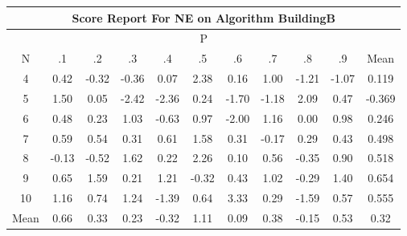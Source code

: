 \documentclass[11pt,a4paper]{report}
\begin{document}
\begin{longtable}{ | c || c | c | c | c | c | c | c | c | c || c |}
\hline
\multicolumn{11}{|c|}{ Score Report For NE on Algorithm BuildingB} \\
\hline
\multicolumn{11}{|c|}{ P } \\
\hline
N & .1 & .2 & .3 & .4 & .5 & .6 & .7 & .8 & .9 & Mean\\
 \hline
 \hline
 \endhead
  4 &  \cellcolor[HTML]{F7F7FF} 0.42 &  \cellcolor[HTML]{FFF7F7} -0.32 &  \cellcolor[HTML]{FFF7F7} -0.36 &  \cellcolor[HTML]{FFFFFF} 0.07 &  \cellcolor[HTML]{BFBFFF} 2.38 &  \cellcolor[HTML]{F7F7FF} 0.16 &  \cellcolor[HTML]{E7E7FF} 1.00 &  \cellcolor[HTML]{FFDFDF} -1.21 &  \cellcolor[HTML]{FFE7E7} -1.07 & 0.119 \\
  5 &  \cellcolor[HTML]{D7D7FF} 1.50 &  \cellcolor[HTML]{FFFFFF} 0.05 &  \cellcolor[HTML]{FFBFBF} -2.42 &  \cellcolor[HTML]{FFC7C7} -2.36 &  \cellcolor[HTML]{F7F7FF} 0.24 &  \cellcolor[HTML]{FFD7D7} -1.70 &  \cellcolor[HTML]{FFDFDF} -1.18 &  \cellcolor[HTML]{C7C7FF} 2.09 &  \cellcolor[HTML]{F7F7FF} 0.47 & -0.369 \\
  6 &  \cellcolor[HTML]{EFEFFF} 0.48 &  \cellcolor[HTML]{F7F7FF} 0.23 &  \cellcolor[HTML]{E7E7FF} 1.03 &  \cellcolor[HTML]{FFEFEF} -0.63 &  \cellcolor[HTML]{E7E7FF} 0.97 &  \cellcolor[HTML]{FFCFCF} -2.00 &  \cellcolor[HTML]{DFDFFF} 1.16 &  \cellcolor[HTML]{FFFFFF} 0.00 &  \cellcolor[HTML]{E7E7FF} 0.98 & 0.246 \\
  7 &  \cellcolor[HTML]{EFEFFF} 0.59 &  \cellcolor[HTML]{EFEFFF} 0.54 &  \cellcolor[HTML]{F7F7FF} 0.31 &  \cellcolor[HTML]{EFEFFF} 0.61 &  \cellcolor[HTML]{D7D7FF} 1.58 &  \cellcolor[HTML]{F7F7FF} 0.31 &  \cellcolor[HTML]{FFF7F7} -0.17 &  \cellcolor[HTML]{F7F7FF} 0.29 &  \cellcolor[HTML]{F7F7FF} 0.43 & 0.498 \\
  8 &  \cellcolor[HTML]{FFFFFF} -0.13 &  \cellcolor[HTML]{FFEFEF} -0.52 &  \cellcolor[HTML]{D7D7FF} 1.62 &  \cellcolor[HTML]{F7F7FF} 0.22 &  \cellcolor[HTML]{C7C7FF} 2.26 &  \cellcolor[HTML]{FFFFFF} 0.10 &  \cellcolor[HTML]{EFEFFF} 0.56 &  \cellcolor[HTML]{FFF7F7} -0.35 &  \cellcolor[HTML]{E7E7FF} 0.90 & 0.518 \\
  9 &  \cellcolor[HTML]{EFEFFF} 0.65 &  \cellcolor[HTML]{D7D7FF} 1.59 &  \cellcolor[HTML]{F7F7FF} 0.21 &  \cellcolor[HTML]{DFDFFF} 1.21 &  \cellcolor[HTML]{FFF7F7} -0.32 &  \cellcolor[HTML]{F7F7FF} 0.43 &  \cellcolor[HTML]{E7E7FF} 1.02 &  \cellcolor[HTML]{FFF7F7} -0.29 &  \cellcolor[HTML]{DFDFFF} 1.40 & 0.654 \\
  10 &  \cellcolor[HTML]{DFDFFF} 1.16 &  \cellcolor[HTML]{EFEFFF} 0.74 &  \cellcolor[HTML]{DFDFFF} 1.24 &  \cellcolor[HTML]{FFDFDF} -1.39 &  \cellcolor[HTML]{EFEFFF} 0.64 &  \cellcolor[HTML]{AFAFFF} 3.33 &  \cellcolor[HTML]{F7F7FF} 0.29 &  \cellcolor[HTML]{FFD7D7} -1.59 &  \cellcolor[HTML]{EFEFFF} 0.57 & 0.555 \\
 \hline
 \hline
Mean &  \cellcolor[HTML]{EFEFFF} 0.66 &  \cellcolor[HTML]{F7F7FF} 0.33 &  \cellcolor[HTML]{F7F7FF} 0.23 &  \cellcolor[HTML]{FFF7F7} -0.32 &  \cellcolor[HTML]{E7E7FF} 1.11 &  \cellcolor[HTML]{FFFFFF} 0.09 &  \cellcolor[HTML]{F7F7FF} 0.38 &  \cellcolor[HTML]{FFFFFF} -0.15 &  \cellcolor[HTML]{EFEFFF} 0.53 &  \cellcolor[HTML]{F7F7FF} 0.32
\end{longtable}
\end{document}
